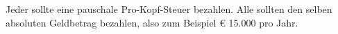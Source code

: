 Jeder sollte eine pauschale Pro-Kopf-Steuer bezahlen.
Alle sollten den selben absoluten Geldbetrag bezahlen, also zum Beispiel € 15.000 pro Jahr.